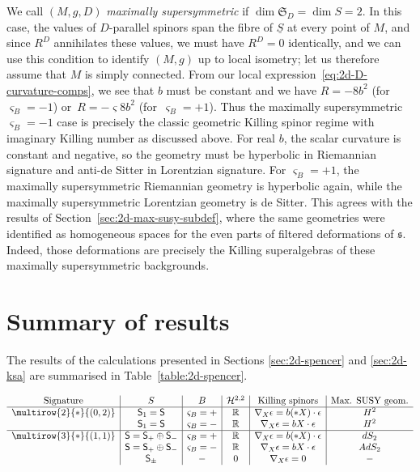 \documentclass[pdftex]{sigma}
\numberwithin{equation}{section}
\newcommand{\fs}{\mathfrak{s}}
\newcommand{\fS}{\mathfrak{S}}
\newcommand{\RR}{\mathbb{R}}
\newcommand{\cH}{\mathcal{H}}
\newcommand{\ssS}{\mathsf{S}}
\newcommand{\Sbundle}{\underline{S}}
\newcommand{\1}{\mathbbm{1}}
\begin{document}
We call $(M,g,D)$ \emph{maximally supersymmetric} if $\dim\fS_D=\dim S=2$. In this case, the values of $D$-parallel spinors span the fibre of $\Sbundle$ at every point of $M$, and since $R^D$ annihilates these values, we must have $R^D=0$ identically, and we can use this condition to identify $(M,g)$ up to local isometry; let us therefore assume that $M$ is simply connected. From our local expression~\eqref{eq:2d-D-curvature-comps}, we see that $b$ must be constant and we have $R=-8b^2 $ (for $\varsigma_B=-1$) or~${R=-\varsigma 8b^2}$ (for~${\varsigma_B=+1}$). Thus the maximally supersymmetric $\varsigma_B=-1$ case is precisely the classic geometric Killing spinor regime with imaginary Killing number as discussed above. For real $b$, the scalar curvature is constant and negative, so the geometry must be hyperbolic in Riemannian signature and anti-de Sitter in Lorentzian signature. For $\varsigma_B=+1$, the maximally supersymmetric Riemannian geometry is hyperbolic again, while the maximally supersymmetric Lorentzian geometry is de Sitter. This agrees with the results of Section~\ref{sec:2d-max-susy-subdef}, where the same geometries were identified as homogeneous spaces for the even parts of filtered deformations of $\fs$. Indeed, those deformations are precisely the Killing superalgebras of these maximally supersymmetric backgrounds.

\section{Summary of results}

The results of the calculations presented in Sections \ref{sec:2d-spencer} and \ref{sec:2d-ksa} are summarised in Table~\ref{table:2d-spencer}.

\begin{table}[ht]
\centering
	\caption{Summary of results, including the Spencer $(2,2)$-cohomology group, a characterisation of the Killing spinors for the admissible connection and the (non-trivial) maximally supersymmetric geometries.}
	\label{table:2d-spencer}
\vspace{1mm}

	\setlength{\extrarowheight}{1.2ex}
	$\begin{array}{c|c|c|c|c|c}
		\text{Signature}	& S		& B		& \cH^{2,2}	& \text{Killing spinors}	& \text{Max. SUSY geom.}	\\
		\hline
		\multirow{2}{*}{(0,2)}	
		& \ssS_1=\ssS	& \varsigma_B = +		& \RR	& \nabla_X\epsilon=b(*X)\cdot \epsilon	& H^2	\\
		& \ssS_1=\ssS 	& \varsigma_B = -		& \RR	& \nabla_X\epsilon=bX\cdot \epsilon		& H^2	\\
		\hline
		\multirow{3}{*}{(1,1)}	
		& \ssS=\ssS_+\oplus\ssS_-	& \varsigma_B = +	& \RR	& \nabla_X\epsilon=b(*X)\cdot \epsilon	& dS_2	\\
		& \ssS=\ssS_+\oplus\ssS_-	& \varsigma_B = -	& \RR	& \nabla_X\epsilon=bX\cdot \epsilon		& AdS_2	\\
		& \ssS_\pm					& -				& 0		& \nabla_X\epsilon=0					& -	
	\end{array}$
\end{table}
\end{document}
